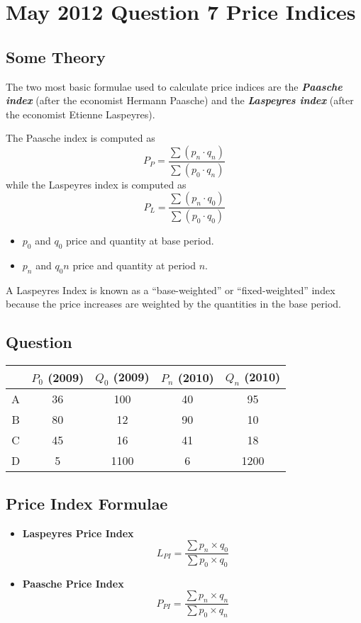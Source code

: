 \documentclass[a4paper,12pt]{article}
\begin{document}
\section*{May 2012 Question 7 Price Indices}

\subsection*{Some Theory}
The two most basic formulae used to calculate price indices are the \textbf{\textit{Paasche index}} (after the economist Hermann Paasche) 
and the \textbf{\textit{Laspeyres index}} (after the economist Etienne Laspeyres).

The Paasche index is computed as
\[  P_P=\frac{\sum (p_{n}\cdot q_{n})}{\sum (p_{0}\cdot q_{n})}  \]
while the Laspeyres index is computed as
\[  P_L=\frac{\sum (p_{n}\cdot q_{0})}{\sum (p_{0}\cdot q_{0})}  \]


\begin{itemize}
	\item $p_0$ and $q_0$ price and quantity at base period.
	\item $p_n$ and $q_0n$ price and quantity at period $n$.
\end{itemize}

A Laspeyres Index is known as a “base-weighted” or “ﬁxed-weighted” index because the price increases are
weighted by the quantities in the base period.

\subsection*{Question}
\begin{center}
	\begin{tabular}{|c|c|c|c|c|}
		\hline \rule[-2ex]{0pt}{5.5ex}  & $P_0$ (2009) & $Q_0$ (2009) & $P_n$ (2010) & $Q_n$ (2010) \\ 
		\hline \rule[-2ex]{0pt}{5.5ex} A & 36 & 100 & 40 & 95 \\ 
		\hline \rule[-2ex]{0pt}{5.5ex} B & 80 & 12 & 90 & 10 \\ 
		\hline \rule[-2ex]{0pt}{5.5ex} C & 45 & 16 & 41 & 18 \\ 
		\hline \rule[-2ex]{0pt}{5.5ex} D & 5 & 1100 & 6 & 1200 \\ \hline 
	\end{tabular} 
\end{center}

\subsection*{Price Index Formulae}
\begin{itemize}
	\item \textbf{Laspeyres Price Index} 
	\[L_{PI} =  \frac{\sum  p_n \times q_0}{\sum  p_0 \times q_0}\]
	\item \textbf{Paasche Price Index}
	\[P_{PI} =  \frac{\sum  p_n \times q_n}{\sum  p_0 \times q_n}\]
\end{itemize}
\end{document}
